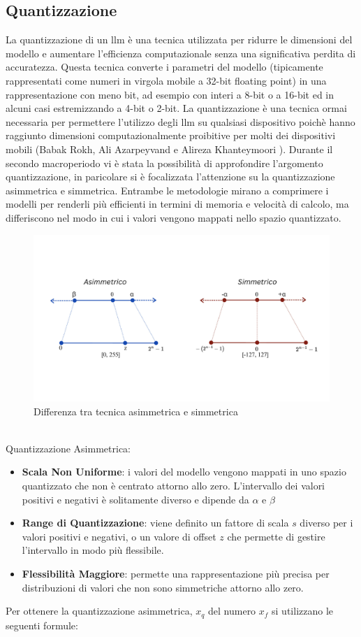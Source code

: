     \subsection{Quantizzazione}
    La quantizzazione di un \gls{llm} è una tecnica utilizzata per ridurre le dimensioni del modello e aumentare l'efficienza computazionale senza una significativa perdita di accuratezza. Questa tecnica converte i parametri del modello (tipicamente rappresentati come numeri in virgola mobile a 32-bit floating point) in una rappresentazione con meno bit, ad esempio con interi a 8-bit o a 16-bit ed in alcuni casi estremizzando a 4-bit o 2-bit.
    La quantizzazione è una tecnica ormai necessaria per permettere l'utilizzo degli \gls{llm} su qualsiasi dispositivo poichè hanno raggiunto dimensioni computazionalmente proibitive per molti dei dispositivi mobili (Babak Rokh, Ali Azarpeyvand e Alireza Khanteymoori \cite{article:Rokh2022ACS}).
    Durante il secondo macroperiodo vi è stata la possibilità di approfondire l'argomento quantizzazione, in paricolare si è focalizzata l'attenzione su la quantizzazione asimmetrica e simmetrica.
    Entrambe le metodologie mirano a comprimere i modelli per renderli più efficienti in termini di memoria e velocità di calcolo, ma differiscono nel modo in cui i valori vengono mappati nello spazio quantizzato.
    \begin{figure}[htp]
    \centering
    \includegraphics[width=13cm]{img/AsymmetricSymmetric.pdf}
    \caption{Differenza tra tecnica asimmetrica e simmetrica}
    \end{figure}
    \\
    Quantizzazione Asimmetrica:
    \begin{itemize}
        \item \textbf{Scala Non Uniforme}: i valori del modello vengono mappati in uno spazio quantizzato che non è centrato attorno allo zero. L'intervallo dei valori positivi e negativi è solitamente diverso e dipende da $\alpha$ e $\beta$
        \item \textbf{Range di Quantizzazione}: viene definito un fattore di scala $s$ diverso per i valori positivi e negativi, o un valore di offset $z$ che permette di gestire l'intervallo in modo più flessibile.
        \item \textbf{Flessibilità Maggiore}: permette una rappresentazione più precisa per distribuzioni di valori che non sono simmetriche attorno allo zero.
    \end{itemize}
    Per ottenere la quantizzazione asimmetrica, $x_q$ del numero $x_f$ si utilizzano le seguenti formule:
    
